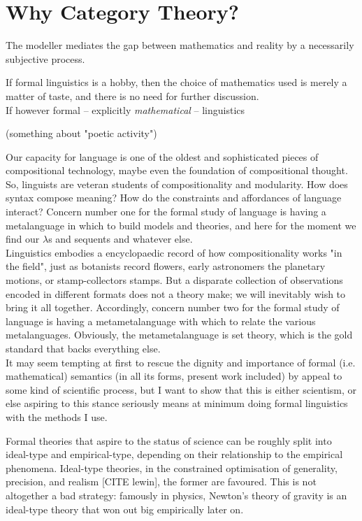 \section{Why Category Theory?}

The modeller mediates the gap between mathematics and reality by a necessarily subjective process.

If formal linguistics is a hobby, then the choice of mathematics used is merely a matter of taste, and there is no need for further discussion.\\

If however formal -- explicitly \emph{mathematical} -- linguistics 

(something about "poetic activity")

Our capacity for language is one of the oldest and sophisticated pieces of compositional technology, maybe even the foundation of compositional thought. So, linguists are veteran students of compositionality and modularity. How does syntax compose meaning? How do the constraints and affordances of language interact? Concern number one for the formal study of language is having a metalanguage in which to build models and theories, and here for the moment we find our $\lambda$s and sequents and whatever else.\\

Linguistics embodies a encyclopaedic record of how compositionality works "in the field", just as botanists record flowers, early astronomers the planetary motions, or stamp-collectors stamps. But a disparate collection of observations encoded in different formats does not a theory make; we will inevitably wish to bring it all together. Accordingly, concern number two for the formal study of language is having a metametalanguage with which to relate the various metalanguages. Obviously, the metametalanguage is set theory, which is the gold standard that backs everything else.\\

It may seem tempting at first to rescue the dignity and importance of formal (i.e. mathematical) semantics (in all its forms, present work included) by appeal to some kind of scientific process, but I want to show that this is either scientism, or else aspiring to this stance seriously means at minimum doing formal linguistics with the methods I use.

Formal theories that aspire to the status of science can be roughly split into ideal-type and empirical-type, depending on their relationship to the empirical phenomena. Ideal-type theories, in the constrained optimisation of generality, precision, and realism [CITE lewin], the former are favoured. This is not altogether a bad strategy: famously in physics, Newton's theory of gravity is an ideal-type theory that won out big empirically later on.

